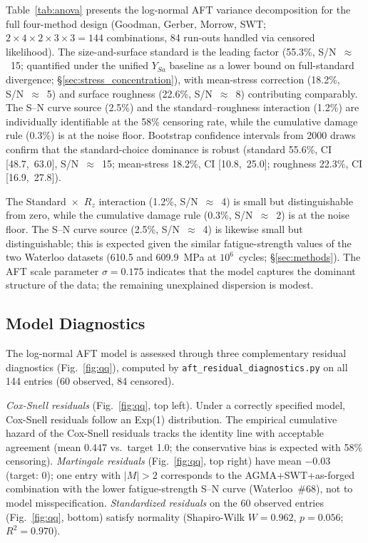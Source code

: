 \documentclass[twocolumn,12pt,a4paper]{article}
\begin{document}
Table~\ref{tab:anova} presents the log-normal AFT variance
decomposition for the full four-method design (Goodman, Gerber,
Morrow, SWT; $2\times4\times2\times3\times3=144$ combinations,
84 run-outs handled via censored likelihood). The size-and-surface
standard is the leading factor (55.3\%, S/N~$\approx$~15; quantified
under the unified $Y_{Sa}$ baseline as a lower bound on full-standard
divergence; \S\ref{sec:stress_concentration}), with mean-stress
correction (18.2\%, S/N~$\approx$~5) and surface roughness (22.6\%,
S/N~$\approx$~8) contributing comparably. The S--N curve source
(2.5\%) and the standard--roughness interaction (1.2\%) are
individually identifiable at the 58\% censoring rate, while the
cumulative damage rule (0.3\%) is at the noise floor. Bootstrap
confidence intervals from 2000 draws confirm that the
standard-choice dominance is robust (standard 55.6\%, CI
[48.7,~63.0], S/N~$\approx$~15; mean-stress 18.2\%, CI
[10.8,~25.0]; roughness 22.3\%, CI [16.9,~27.8]).

The Standard~$\times$~$R_z$ interaction (1.2\%, S/N~$\approx$~4) is
small but distinguishable from zero, while the cumulative damage rule
(0.3\%, S/N~$\approx$~2) is at the noise floor. The S--N curve source
(2.5\%, S/N~$\approx$~4) is likewise small but distinguishable; this
is expected given the similar fatigue-strength values of the two
Waterloo datasets (610.5 and 609.9~MPa at $10^6$~cycles;
\S\ref{sec:methods}). The
AFT scale parameter $\sigma = 0.175$ indicates that the model
captures the dominant structure of the data; the remaining
unexplained dispersion is modest.

\subsection{Model Diagnostics}

The log-normal AFT model is assessed through three complementary
residual diagnostics (Fig.~\ref{fig:qq}), computed by
\texttt{aft\_residual\_diagnostics.py} on all 144 entries (60
observed, 84 censored).

\textit{Cox-Snell residuals} (Fig.~\ref{fig:qq}, top left). Under a
correctly specified model, Cox-Snell residuals follow an Exp(1)
distribution. The empirical cumulative hazard of the Cox-Snell
residuals tracks the identity line with acceptable agreement (mean
0.447 vs.\ target 1.0; the conservative bias is expected with 58\%
censoring). \textit{Martingale residuals} (Fig.~\ref{fig:qq}, top
right) have mean $-$0.03 (target: 0); one entry with $|M| > 2$
corresponds to the AGMA+SWT+as-forged combination with the lower
fatigue-strength S--N curve (Waterloo~\#68), not to model
misspecification. \textit{Standardized
residuals} on the 60 observed entries (Fig.~\ref{fig:qq}, bottom)
satisfy normality (Shapiro-Wilk $W=0.962$, $p=0.056$; $R^2=0.970$).
\end{document}
